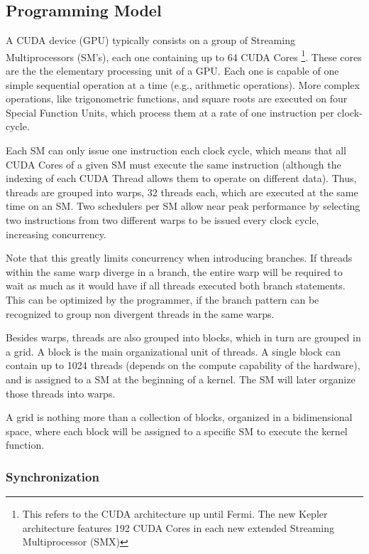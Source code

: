 \subsection{Programming Model}
\label{sec:cuda:model}

A CUDA device (GPU) typically consists on a group of Streaming Multiprocessors (SM's), each one containing up to 64 CUDA Cores \footnote{This refers to the CUDA architecture up until Fermi. The new Kepler architecture features 192 CUDA Cores in each new extended Streaming Multiprocessor (SMX)}.
These cores are the the elementary processing unit of a GPU. Each one is capable of one simple sequential operation at a time (e.g., arithmetic operations). More complex operations, like trigonometric functions, and square roots are executed on four Special Function Units, which process them at a rate of one instruction per clock-cycle.

Each SM can only issue one instruction each clock cycle, which means that all CUDA Cores of a given SM must execute the same instruction (although the indexing of each CUDA Thread allows them to operate on different data). Thus, threads are grouped into warps, 32 threads each, which are executed at the same time on an SM. Two schedulers per SM allow near peak performance by selecting two instructions from two different warps to be issued every clock cycle, increasing concurrency.

Note that this greatly limits concurrency when introducing branches. If threads within the same warp diverge in a branch, the entire warp will be required to wait as much as it would have if all threads executed both branch statements. This can be optimized by the programmer, if the branch pattern can be recognized to group non divergent threads in the same warps.

Besides warps, threads are also grouped into blocks, which in turn are grouped in a grid. A block is the main organizational unit of threads. A single block can contain up to 1024 threads (depends on the compute capability of the hardware), and is assigned to a SM at the beginning of a kernel. The SM will later organize those threads into warps.

A grid is nothing more than a collection of blocks, organized in a bidimensional space, where each block will be assigned to a specific SM to execute the kernel function.

\subsubsection{Synchronization}
\label{sec:cuda:model:sync}

